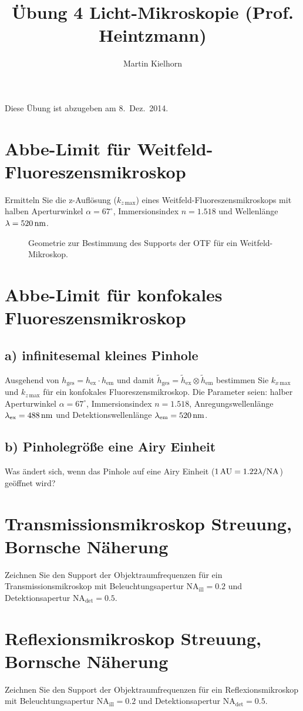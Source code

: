 \documentclass{article}
\begin{document}
\author{Martin Kielhorn}
\title{\"Ubung 4 Licht-Mikroskopie (Prof. Heintzmann)}
\maketitle
\noindent Diese \"Ubung ist abzugeben am 8.~Dez.~2014.

\section{Abbe-Limit f\"ur Weitfeld-Fluoreszensmikroskop}
Ermitteln Sie die z-Aufl\"osung ($k_{z\,\textrm{max}}$) eines
Weitfeld-Fluoreszensmikroskops mit halben Aperturwinkel
$\alpha=67^\circ$, Immersionsindex $n=1.518$ und Wellenl\"ange
$\lambda=\unit[520]{nm}$.

\begin{figure}[htbp]
  \centering
  
  \caption{Geometrie zur Bestimmung des Supports der OTF f\"ur ein Weitfeld-Mikroskop.}
  \label{fig:missing-cone}
\end{figure}


\section{Abbe-Limit f\"ur konfokales Fluoreszensmikroskop}
\subsection*{a) infinitesemal kleines Pinhole}
Ausgehend von $h_\textrm{ges}=h_\textrm{ex}\cdot h_\textrm{em}$ und
damit
$\widetilde h_\textrm{ges}=\widetilde h_\textrm{ex}\otimes\widetilde
h_\textrm{em}$
bestimmen Sie $k_{x\,\textrm{max}}$ und $k_{z\,\textrm{max}}$ f\"ur
ein konfokales Fluoreszensmikroskop. Die Parameter seien: halber
Aperturwinkel $\alpha=67^\circ$, Immersionsindex $n=1.518$,
Anregungswellenl\"ange $\lambda_\textrm{ex}=\unit[488]{nm}$ und
Detektionswellenl\"ange $\lambda_\textrm{em}=\unit[520]{nm}$.
\subsection*{b) Pinholegr\"o\ss e eine Airy Einheit}
Was \"andert sich, wenn das Pinhole auf eine Airy Einheit
($\unit[1]{AU}=1.22\lambda/\textrm{NA}$) ge\"offnet wird?

\section{Transmissionsmikroskop Streuung, Bornsche N\"aherung}
Zeichnen Sie den Support der Objektraumfrequenzen f\"ur ein
Transmissionsmikroskop mit Beleuchtungsapertur
$\textrm{NA}_\textrm{ill} = 0.2$ und Detektionsapertur
$\textrm{NA}_\textrm{det} = 0.5$.
\section{Reflexionsmikroskop Streuung, Bornsche N\"aherung}
Zeichnen Sie den Support der Objektraumfrequenzen f\"ur ein
Reflexionsmikroskop mit Beleuchtungsapertur
$\textrm{NA}_\textrm{ill} = 0.2$ und Detektionsapertur
$\textrm{NA}_\textrm{det} = 0.5$.
\end{document}
